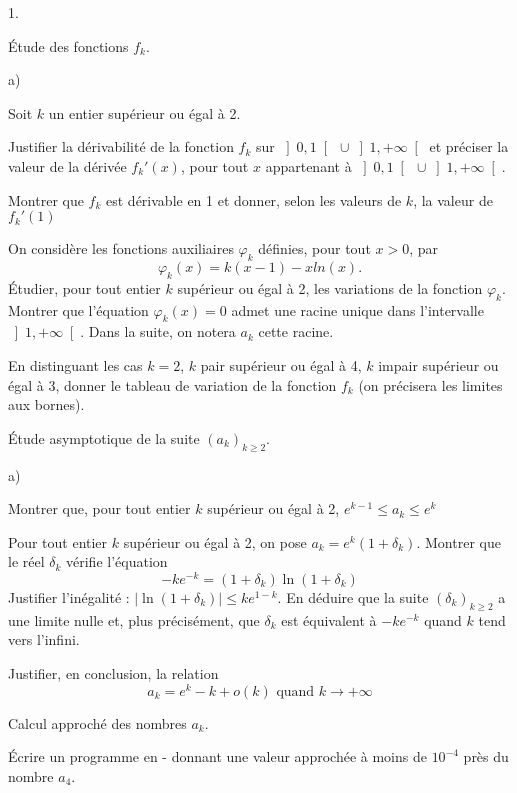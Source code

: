 \documentclass[11pt]{article}%
\begin{document}
\begin{noliste}{1.}
 \setlength{\itemsep}{4mm}
\item Étude des fonctions $f_{k}$.

\begin{noliste}{a)}
 \setlength{\itemsep}{2mm}
\item Soit $k$ un entier supérieur ou égal à 2.

Justifier la dérivabilité de la fonction $f_{k}$ sur $\left] 0,1\right[
\ \cup \left] 1, + \infty \right[ $ et préciser la valeur de la dérivée
$f_{k}{\prime }(x)$, pour tout $x$ appartenant à $\left] 0,1\right[ \
\cup \left] 1, + \infty \right[ $.

Montrer que $f_{k}$ est dérivable en 1 et donner, selon les valeurs de
$k $,
la valeur de $f_{k}{\prime }(1)$

\item On considère les fonctions auxiliaires $\varphi_{k}$ définies,
pour
tout $x>0$, par 
\[
\varphi_{k}(x) = k(x-1)-xln(x).
\]
Étudier, pour tout entier $k$ supérieur ou égal à 2, les variations de
la
fonction $\varphi_{k}$. Montrer que l'équation $\varphi_{k}\left(
x\right)
 = 0$ admet une racine unique dans l'intervalle $\left] 1, + \infty
\right[ $.
Dans la suite, on notera $a_{k}$ cette racine.

\item En distinguant les cas $k = 2$, $k$ pair supérieur ou égal à 4,
$k$
impair supérieur ou égal à 3, donner le tableau de variation de la
fonction $f_{k}$ (on précisera les limites aux bornes).
\end{noliste}

\item Étude asymptotique de la suite $\left( a_{k}\right)_{k\geq 2}$.

\begin{noliste}{a)}
 \setlength{\itemsep}{2mm}
\item Montrer que, pour tout entier $k$ supérieur ou égal à 2,
$e^{k-1}\leq a_{k}\leq e^{k}$

\item Pour tout entier $k$ supérieur ou égal à 2, on pose $a_{k} =
e^{k}\left(
1 + \delta_{k}\right) $. Montrer que le réel $\delta_{k}$ vérifie
l'équation 
\[
-ke^{-k} = \left( 1 + \delta_{k}\right) \ln \left( 1 +
\delta_{k}\right)
\]
Justifier l'inégalité : $\left| \ln \left( 1 + \delta_{k}\right)
\right| \leq ke^{1-k}$. En déduire que la suite $\left( \delta
_{k}\right)_{k\geq 2}$ a une limite nulle et, plus précisément, que
$\delta_{k}$ est équivalent à $-ke^{-k}$ quand $k$ tend vers l'infini.

\item Justifier, en conclusion, la relation 
\[
a_{k} = e^{k}-k + o\left( k\right) \text{ quand }k\rightarrow + \infty
\]
\end{noliste}

\item Calcul approché des nombres $a_{k}$.

Écrire un programme en -\Scilab{} donnant une valeur approchée à moins
de $10^{-4}$ près du nombre $a_{4}$.
\end{noliste}
\end{document}
